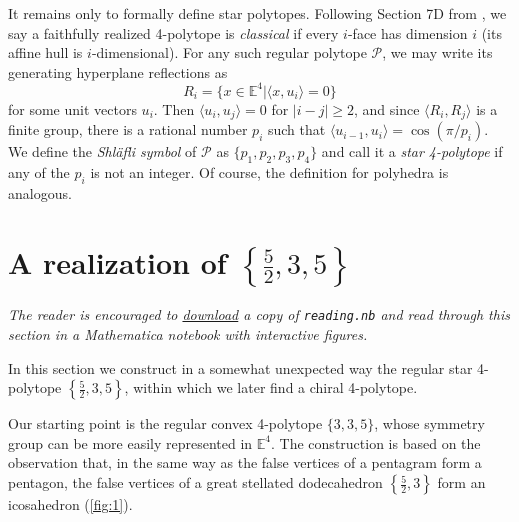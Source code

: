 \documentclass{article}
\theoremstyle{definition}
\newcommand{\E}{\mathbb{E}}
\newcommand{\p}{\mathcal{P}}
\begin{document}
	\vspace{.5cm}
	
	It remains only to formally define star polytopes. Following Section 7D from \cite{abstract-polytopes}, we say a faithfully realized 4-polytope is \textit{classical} if every $i$-face has dimension $i$ (its affine hull is $i$-dimensional). For any such regular polytope $\p$, we may write its generating hyperplane reflections as
	\[R_i=\{x\in\E^4|\langle x,u_i\rangle=0\}\]
	for some unit vectors $u_i$. Then $\langle u_i,u_j\rangle=0$ for $|i-j|\geq2$, and since $\langle R_i,R_j\rangle$ is a finite group, there is a rational number $p_i$ such that $\langle u_{i-1},u_i\rangle=\cos(\pi/p_i)$. We define the \textit{Shläfli symbol} of $\p$ as $\{p_1,p_2,p_3,p_4\}$ and call it a \textit{star 4-polytope} if any of the $p_i$ is not an integer. Of course, the definition for polyhedra is analogous.

	\section{A realization of $\left\{\frac{5}{2},3,5\right\}$}
	\textit{The reader is encouraged to \href{https://github.com/danimalabares/tesina/blob/main/reading.nb}{download} a copy of \texttt{reading.nb} and read through this section in a Mathematica notebook with interactive figures.}
	
	In this section we construct in a somewhat unexpected way the regular star 4-polytope $\left\{\frac{5}{2},3,5\right\}$, within which we later find a chiral 4-polytope.
	
	Our starting point is the regular convex 4-polytope $\{3,3,5\}$, whose symmetry group can be more easily represented in $\E^4$. The construction is based on the observation that, in the same way as the false vertices of a pentagram form a pentagon, the false vertices of a great stellated dodecahedron $\left\{\frac{5}{2},3\right\}$ form an icosahedron (\cref{fig:1}).
	
\end{document}
